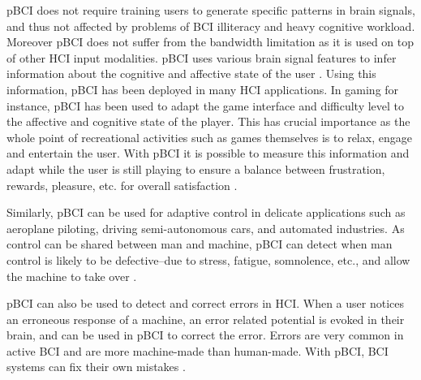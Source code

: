 pBCI does not require training users to generate specific patterns in brain signals, and thus not affected by problems of BCI illiteracy and heavy cognitive workload.
Moreover pBCI does not suffer from the bandwidth limitation as it is used on top of other HCI input modalities. 
pBCI uses various brain signal features to infer information about the cognitive and affective state of the user \citep{george_overview_2010}.   
Using this information, pBCI has been deployed in many HCI applications.
In gaming for instance, pBCI has been used to adapt the game interface and difficulty level to the affective and cognitive state of the player. 
This has crucial importance as the whole point of recreational activities such as games themselves is to relax, engage and entertain the user. 
With pBCI it is possible to measure this information and adapt while the user is still playing to ensure a balance between frustration, rewards, pleasure, etc. for overall satisfaction \citep{cutrell_bci_2008,girouard_designing_2013}.

Similarly, pBCI can be used for adaptive control in delicate applications such as aeroplane piloting, driving semi-autonomous cars, and automated industries. 
As control can be shared between man and machine, pBCI can detect when man control is likely to be defective--due to stress, fatigue, somnolence, etc., and allow the machine to take over \citep{cutrell_bci_2008,george_overview_2010}. 

pBCI can also be used to detect and correct errors in HCI. When a user notices an erroneous response of a machine, an error related potential is evoked in their brain, and can be used in pBCI to correct the error. Errors are very common in active BCI and are more machine-made than human-made. With pBCI, BCI systems can fix their own mistakes \citep{ferrez_error-related_2008, ferrez_simultaneous_2008,george_overview_2010}.

